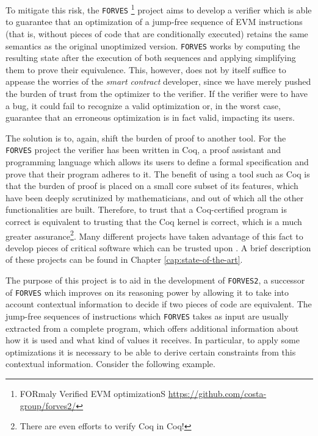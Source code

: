 To mitigate this risk, the \verb|FORVES|
\footnote{FORmaly Verified EVM optimizationS \url{https://github.com/costa-group/forves2/}}
project aims to develop a verifier which is able to guarantee that an optimization of a jump-free
sequence of EVM instructions (that is, without pieces of code that are conditionally executed)
retains the same semantics as the original unoptimized version. \verb|FORVES| works by computing the 
resulting state after the execution of both sequences and applying simplifying them to prove their
equivalence.
This, however, does not by itself suffice to appease the worries of the \emph{smart contract} 
developer, since we have merely pushed the burden of trust from the optimizer to the verifier. If the 
verifier were to have a bug, it could fail to recognize a valid optimization or, in the worst case, 
guarantee that an erroneous optimization is in fact valid, impacting its users.

The solution is to, again, shift the burden of proof to another tool. For the \verb|FORVES| project the 
verifier has been written in Coq, a proof assistant and programming language which allows its users to 
define a formal specification and prove that their program adheres to it. The benefit of using a tool
such as Coq is that the burden of proof is placed on a small core subset of its features, which have
been deeply scrutinized by mathematicians, and out of which all the other functionalities are built.
Therefore, to trust that a Coq-certified program is correct is equivalent to trusting that the Coq  
kernel is correct, which is a much greater 
assurance\footnote{There are even efforts to verify Coq in Coq!\cite{sozeau:hal-04077552}}. 
Many different projects have taken advantage of this fact to develop pieces of critical software which
can be trusted upon \cite{ConCert,FiatCryptoSP19,CompCert,Iris,Cosette}. A brief description of these projects can be found in Chapter 
    \ref{cap:state-of-the-art}.

The purpose of this project is to aid in the development of \verb|FORVES2|, a successor of \verb|FORVES|
which improves on its reasoning power by allowing it to take into account contextual information to
decide if two pieces of code are equivalent. The jump-free sequences of instructions which \verb|FORVES|
takes as input are usually extracted from a complete program, which offers additional information about
how it is used and what kind of values it receives. In particular, to apply some optimizations it is
necessary to be able to derive certain constraints from this contextual information. Consider the 
following example.

